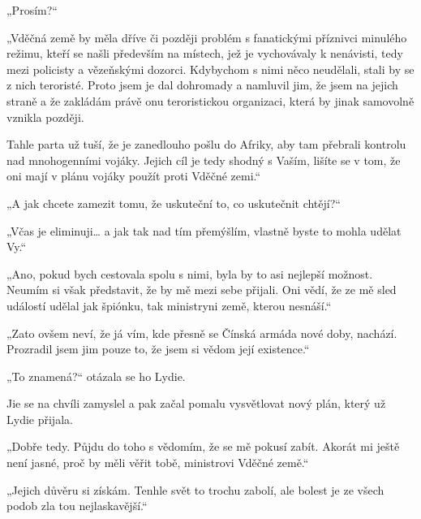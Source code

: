 „Prosím?“

„Vděčná země by měla dříve či později problém s fanatickými příznivci minulého režimu, kteří se našli především na místech, jež je vychovávaly k nenávisti, tedy mezi policisty a vězeňskými dozorci. Kdybychom s nimi něco neudělali, stali by se z nich teroristé. Proto jsem je dal dohromady a namluvil jim, že jsem na jejich straně a že zakládám právě onu teroristickou organizaci, která by jinak samovolně vznikla později. 

Tahle parta už tuší, že je zanedlouho pošlu do Afriky, aby tam přebrali kontrolu nad mnohogenními vojáky. Jejich cíl je tedy shodný s Vaším, lišíte se v tom, že oni mají v plánu vojáky použít proti Vděčné zemi.“

„A jak chcete zamezit tomu, že uskuteční to, co uskutečnit chtějí?“

„Včas je eliminuji… a jak tak nad tím přemýšlím, vlastně byste to mohla udělat Vy.“

„Ano, pokud bych cestovala spolu s nimi, byla by to asi nejlepší možnost. Neumím si však představit, že by mě mezi sebe přijali. Oni vědí, že ze mě sled událostí udělal jak špiónku, tak ministryni země, kterou nesnáší.“

„Zato ovšem neví, že já vím, kde přesně se Čínská armáda nové doby, nachází. Prozradil jsem jim pouze to, že jsem si vědom její existence.“

„To znamená?“ otázala se ho Lydie.

Jie se na chvíli zamyslel a pak začal pomalu vysvětlovat nový plán, který už Lydie přijala.

„Dobře tedy. Půjdu do toho s vědomím, že se mě pokusí zabít. Akorát mi ještě není jasné, proč by měli věřit tobě, ministrovi Vděčné země.“

„Jejich důvěru si získám. Tenhle svět to trochu zabolí, ale bolest je ze všech podob zla tou nejlaskavější.“
